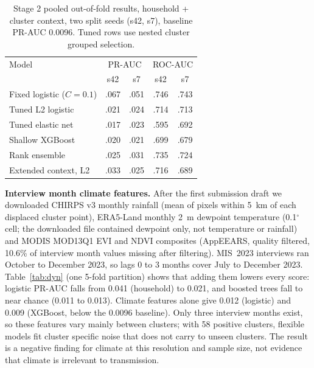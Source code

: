 \documentclass[11pt]{article}
\begin{document}
\begin{table}[t]
\centering\small
\begin{tabular}{lcccc}
\toprule
Model & \multicolumn{2}{c}{PR-AUC} & \multicolumn{2}{c}{ROC-AUC}\\
 & s42 & s7 & s42 & s7\\
\midrule
Fixed logistic ($C=0.1$) & .067 & .051 & .746 & .743\\
Tuned L2 logistic & .021 & .024 & .714 & .713\\
Tuned elastic net & .017 & .023 & .595 & .692\\
Shallow XGBoost & .020 & .021 & .699 & .679\\
Rank ensemble & .025 & .031 & .735 & .724\\
Extended context, L2 & .033 & .025 & .716 & .689\\
\bottomrule
\end{tabular}
\caption{Stage 2 pooled out-of-fold results, household + cluster context, two split seeds (s42, s7), baseline PR-AUC 0.0096. Tuned rows use nested cluster grouped selection.}
\label{tab:stage2}
\end{table}

\textbf{Interview month climate features.} After the first submission draft we downloaded CHIRPS v3 monthly rainfall (mean of pixels within 5~km of each displaced cluster point), ERA5-Land monthly 2~m dewpoint temperature (0.1$^\circ$ cell; the downloaded file contained dewpoint only, not temperature or rainfall) and MODIS MOD13Q1 EVI and NDVI composites (AppEEARS, quality filtered, 10.6\% of interview month values missing after filtering). MIS~2023 interviews ran October to December 2023, so lags 0 to 3 months cover July to December 2023. Table~\ref{tab:dyn} (one 5-fold partition) shows that adding them lowers every score: logistic PR-AUC falls from 0.041 (household) to 0.021, and boosted trees fall to near chance (0.011 to 0.013). Climate features alone give 0.012 (logistic) and 0.009 (XGBoost, below the 0.0096 baseline). Only three interview months exist, so these features vary mainly between clusters; with 58 positive clusters, flexible models fit cluster specific noise that does not carry to unseen clusters. The result is a negative finding for climate at this resolution and sample size, not evidence that climate is irrelevant to transmission.
\end{document}
